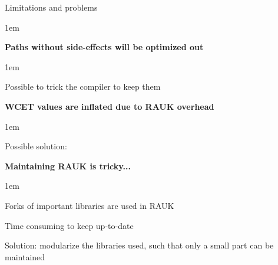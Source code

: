\begin{frame}{Limitations and problems}
    \begin{itemize-size}{1em}
            \item \textbf{Paths without side-effects will be optimized out}
                \begin{itemize-size}{1em}
                    \item Possible to trick the compiler to keep them
                \end{itemize-size}
            \item \textbf{WCET values are inflated due to RAUK overhead}
                \begin{itemize-size}{1em}
                    \item Possible solution:
                \end{itemize-size}
            \item \textbf{Maintaining RAUK is tricky...}
                \begin{itemize-size}{1em}
                    \item Forks of important libraries are used in RAUK
                    \item Time consuming to keep up-to-date
                    \item Solution: modularize the libraries used, such
                    that only a small part can be maintained
                \end{itemize-size}
        \end{itemize-size}
\end{frame}
